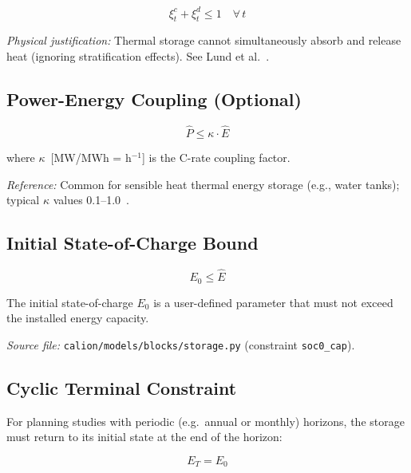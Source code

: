 \documentclass[a4paper,12pt]{article}
\begin{document}
\begin{equation}
  \xi^{c}_{t} + \xi^{d}_{t} \leq 1
  \quad \forall\, t
  \tag{ST-6}
  \label{eq:st6}
\end{equation}

\noindent\textit{Physical justification:} Thermal storage cannot simultaneously absorb and
release heat (ignoring stratification effects). See Lund et al.~\cite{Lund2007}.

\subsection{Power-Energy Coupling (Optional)}

\begin{equation}
  \hat{P} \leq \kappa \cdot \hat{E}
  \tag{ST-7}
  \label{eq:st7}
\end{equation}

where $\kappa$~[MW/MWh = h$^{-1}$] is the C-rate coupling factor.

\noindent\textit{Reference:} Common for sensible heat thermal energy storage (e.g., water
tanks); typical $\kappa$ values 0.1–1.0~\cite{Haller2019}.

\subsection{Initial State-of-Charge Bound}

\begin{equation}
  E_{0} \leq \hat{E}
  \tag{ST-8}
  \label{eq:st8}
\end{equation}

The initial state-of-charge $E_0$ is a user-defined parameter that must not exceed the
installed energy capacity.

\noindent\textit{Source file:} \texttt{calion/models/blocks/storage.py}
(constraint \texttt{soc0\_cap}).

\subsection{Cyclic Terminal Constraint}

For planning studies with periodic (e.g.\ annual or monthly) horizons, the storage must
return to its initial state at the end of the horizon:

\begin{equation}
  E_{T} = E_{0}
  \tag{ST-9}
  \label{eq:st9}
\end{equation}
\end{document}
